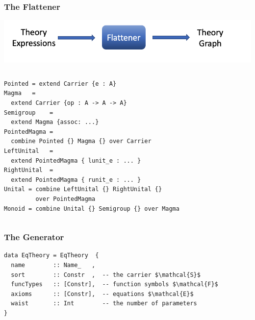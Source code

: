 \documentclass[t,10pt,numbers,fleqn,usenames,xcolor=dvipsnames]{beamer}
\begin{document}
\begin{frame}[fragile]
\frametitle{The Flattener} 
\begin{center}
\includegraphics[scale=0.2]{figures/flattener.png}
\end{center}

\begin{overprint}
\begin{columns}
\begin{column}{0.45\textwidth}
\begin{verbatim}
Pointed = extend Carrier {e : A}
Magma   = 
  extend Carrier {op : A -> A -> A}
Semigroup    = 
  extend Magma {assoc: ...}
PointedMagma = 
  combine Pointed {} Magma {} over Carrier
LeftUnital   = 
  extend PointedMagma { lunit_e : ... }
RightUnital  = 
  extend PointedMagma { runit_e : ... }
Unital = combine LeftUnital {} RightUnital {} 
         over PointedMagma
Monoid = combine Unital {} Semigroup {} over Magma
\end{verbatim}
\end{column}
\begin{column}{0.45\textwidth}



{\tiny
}
\end{column}
\end{columns}
\end{overprint}
\end{frame}

\begin{frame}[fragile]
\frametitle{The Generator}
\begin{verbatim}
data EqTheory = EqTheory  {
  name        :: Name_   ,
  sort        :: Constr  ,  -- the carrier $\mathcal{S}$
  funcTypes   :: [Constr],  -- function symbols $\mathcal{F}$
  axioms      :: [Constr],  -- equations $\mathcal{E}$
  waist       :: Int        -- the number of parameters
}  
\end{verbatim}
\end{frame}
\end{document}
